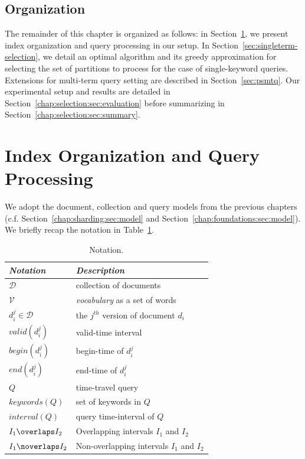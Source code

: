 \subsection{Organization}
The remainder of this chapter is organized as follows: in Section~\ref{chap:selection:sec:model}, we present index organization and query processing in our setup. In Section~\ref{sec:singleterm-selection}, we detail an optimal algorithm and
its greedy approximation for selecting the set of partitions to process for
the case of single-keyword queries. Extensions for multi-term query
setting are described in Section~\ref{sec:psmtq}. Our experimental setup and results are detailed in Section~\ref{chap:selection:sec:evaluation} before summarizing in Section~\ref{chap:selection:sec:summary}. 


\section{Index Organization and Query Processing}
\label{chap:selection:sec:model} 

We adopt the document, collection and query models from the previous chapters (c.f. Section~\ref{chap:sharding:sec:model} and Section~\ref{chap:foundations:sec:model}). We briefly recap the notation in Table~\ref{tab:selection_notation}.

\begin{table}
\centering
\begin{tabular}{ll}
\hline  
\multicolumn{1}{l}{\emph{Notation}} &  \multicolumn{1}{l}{\emph{Description}} \\
\hline
$\mathcal{D}$ & collection of documents\\
$\mathcal{V}$ & \emph{vocabulary} as a set of words\\
$d_i^j \in \mathcal{D}$ & the $j^{th}$ version of document $d_i$\\
$valid(d_i^j)$ & valid-time interval \\ 
$begin(d_i^j)$ & begin-time of $d_i^j$  \\
$end(d_i^j)$ & end-time of $d_i^j$ \\
$Q$ & time-travel query\\
$keywords(Q)$ & set of keywords in $Q$\\
$interval(Q)$ & query time-interval of $Q$\\
$I_1 \overlaps I_2$ & Overlapping intervals $I_1$ and $I_2$ \\
$I_1 \noverlaps I_2$ & Non-overlapping intervals $I_1$ and $I_2$ \\
\hline
\end{tabular}
\caption{Notation.}
\label{tab:selection_notation}
\end{table}

